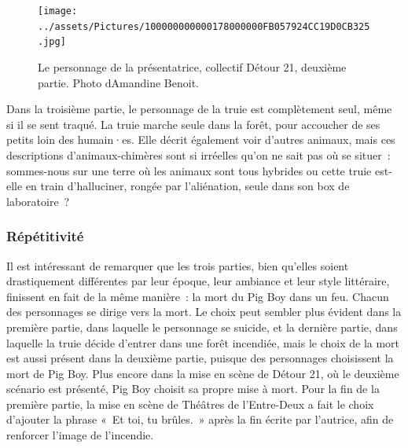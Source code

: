 \documentclass[
]{article}
\begin{document}
\begin{figure}
\centering
\texttt{[image: ../assets/Pictures/100000000000178000000FB057924CC19D0CB325.jpg]}
\caption{Le personnage de la présentatrice, collectif Détour 21, deuxième partie. Photo d\textquotesingle Amandine Benoit.}\label{fig:fig-2--2-4}
\end{figure}

Dans la troisième partie, le personnage de la truie est complètement seul, même si il se sent traqué. La truie marche seule dans la forêt, pour accoucher de ses petits loin des humain·es. Elle décrit également voir d'autres animaux, mais ces descriptions d'animaux-chimères sont si irréelles qu'on ne sait pas où se situer~: sommes-nous sur une terre où les animaux sont tous hybrides ou cette truie est-elle en train d'halluciner, rongée par l'aliénation, seule dans son box de laboratoire~?

\subsubsection{Répétitivité}\label{ruxe9puxe9titivituxe9}

Il est intéressant de remarquer que les trois parties, bien qu'elles soient drastiquement différentes par leur époque, leur ambiance et leur style littéraire, finissent en fait de la même manière~: la mort du Pig Boy dans un feu. Chacun des personnages se dirige vers la mort. Le choix peut sembler plus évident dans la première partie, dans laquelle le personnage se suicide, et la dernière partie, dans laquelle la truie décide d'entrer dans une forêt incendiée, mais le choix de la mort est aussi présent dans la deuxième partie, puisque des personnages choisissent la mort de Pig Boy. Plus encore dans la mise en scène de Détour 21, où le deuxième scénario est présenté, Pig Boy choisit sa propre mise à mort. Pour la fin de la première partie, la mise en scène de Théâtres de l'Entre-Deux a fait le choix d'ajouter la phrase «~Et toi, tu brûles.~» après la fin écrite par l'autrice, afin de renforcer l'image de l'incendie.
\end{document}
